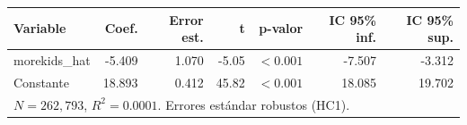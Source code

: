 
\begin{tabular}{lrrrrrr}
\toprule
Variable & Coef. & Error est. & t & p-valor & IC 95\% inf. & IC 95\% sup.\\
\midrule
morekids\_hat & -5.409 & 1.070 & -5.05 & $<0.001$ & -7.507 & -3.312\\
Constante & 18.893 & 0.412 & 45.82 & $<0.001$ & 18.085 & 19.702\\
\midrule
\multicolumn{7}{l}{$N=262{,}793$, $R^2=0.0001$. Errores estándar robustos (HC1).}\\
\bottomrule
\end{tabular}
